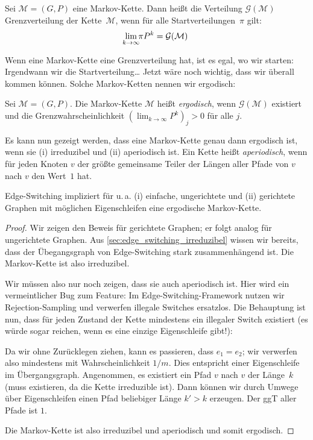 \begin{definition}
    Sei $\mathcal M = (G, P)$ eine Markov-Kette.
    Dann heißt die Verteilung $\mathcal G(\mathcal M)$ Grenzverteilung der Kette~$\mathcal M$, wenn für alle Startverteilungen~$\pi$ gilt:
    \begin{equation}
        \smashoperator{\lim_{k \to \infty}} \pi P^k = \mathcal G(\mathcal M)
    \end{equation}
\end{definition}

Wenn eine Markov-Kette eine Grenzverteilung hat, ist es egal, wo wir starten:
Irgendwann  wir die Startverteilung\dots{}
Jetzt wäre noch wichtig, dass wir überall  kommen können.
Solche Markov-Ketten nennen wir ergodisch:

\begin{definition}
    Sei $\mathcal M = (G, P)$. Die Markov-Kette $\mathcal M$ heißt \emph{ergodisch}, wenn $\mathcal G(\mathcal M)$ existiert und die Grenzwahrscheinlichkeit $(\lim_{k \to \infty} P^k)_j > 0$ für alle $j$.
\end{definition}

Es kann nun gezeigt werden, dass eine Markov-Kette genau dann ergodisch ist, wenn sie (i) irreduzibel und (ii) aperiodisch ist.
Ein Kette heißt \emph{aperiodisch}, wenn für jeden Knoten $v$ der größte gemeinsame Teiler der Längen aller Pfade von $v$ nach $v$ den Wert~$1$ hat.

\begin{theorem}
    Edge-Switching impliziert für u.\,a. (i) einfache, ungerichtete und (ii) gerichtete Graphen mit möglichen Eigenschleifen eine ergodische Markov-Kette.
\end{theorem}

\begin{proof}
    Wir zeigen den Beweis für gerichtete Graphen; er folgt analog für ungerichtete Graphen.
    Aus \cref{sec:edge_switching_irreduzibel} wissen wir bereits, dass der Übegangsgraph von Edge-Switching stark zusammenhängend ist.
    Die Markov-Kette ist also irreduzibel.

    Wir müssen also nur noch zeigen, dass sie auch aperiodisch ist.
    Hier wird ein vermeintlicher Bug zum Feature:
    Im Edge-Switching-Framework nutzen wir Rejection-Sampling und verwerfen illegale Switches ersatzlos.
    Die Behauptung ist nun, dass für jeden Zustand der Kette mindestens ein illegaler Switch existiert (es würde sogar reichen, wenn es eine einzige Eigenschleife gibt!):

    Da wir ohne Zurücklegen ziehen, kann es passieren, dass $e_1 = e_2$; wir verwerfen also mindestens mit Wahrscheinlichkeit $1 / m$.
    Dies entspricht einer Eigenschleife im Übergangsgraph.
    Angenommen, es existiert ein Pfad $v$ nach $v$ der Länge~$k$ (muss existieren, da die Kette irreduzible ist).
    Dann können wir durch Umwege über Eigenschleifen einen Pfad beliebiger Länge $k' > k$ erzeugen.
    Der ggT aller Pfade ist $1$.

    Die Markov-Kette ist also irreduzibel und aperiodisch und somit ergodisch.
\end{proof}

